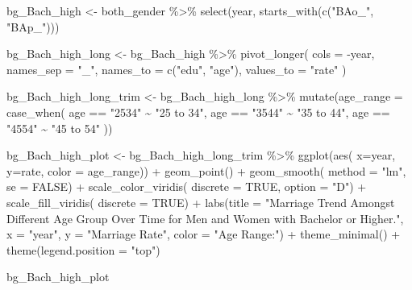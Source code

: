 \documentclass[
]{article}
\newenvironment{Shaded}{\begin{snugshade}}{\end{snugshade}}
\newcommand{\AttributeTok}[1]{\textcolor[rgb]{0.77,0.63,0.00}{#1}}
\newcommand{\ConstantTok}[1]{\textcolor[rgb]{0.00,0.00,0.00}{#1}}
\newcommand{\FunctionTok}[1]{\textcolor[rgb]{0.00,0.00,0.00}{#1}}
\newcommand{\NormalTok}[1]{#1}
\newcommand{\OtherTok}[1]{\textcolor[rgb]{0.56,0.35,0.01}{#1}}
\newcommand{\SpecialCharTok}[1]{\textcolor[rgb]{0.00,0.00,0.00}{#1}}
\newcommand{\StringTok}[1]{\textcolor[rgb]{0.31,0.60,0.02}{#1}}
\begin{document}
\begin{Shaded}
\begin{Highlighting}[]
\NormalTok{bg\_Bach\_high }\OtherTok{\textless{}{-}}\NormalTok{ both\_gender }\SpecialCharTok{\%\textgreater{}\%}
  \FunctionTok{select}\NormalTok{(year, }\FunctionTok{starts\_with}\NormalTok{(}\FunctionTok{c}\NormalTok{(}\StringTok{"BAo\_"}\NormalTok{, }\StringTok{"BAp\_"}\NormalTok{))) }

\NormalTok{bg\_Bach\_high\_long }\OtherTok{\textless{}{-}}\NormalTok{ bg\_Bach\_high }\SpecialCharTok{\%\textgreater{}\%} 
  \FunctionTok{pivot\_longer}\NormalTok{(}
  \AttributeTok{cols =} \SpecialCharTok{{-}}\NormalTok{year,}
  \AttributeTok{names\_sep =} \StringTok{"\_"}\NormalTok{,}
  \AttributeTok{names\_to =} \FunctionTok{c}\NormalTok{(}\StringTok{"edu"}\NormalTok{, }\StringTok{"age"}\NormalTok{),}
  \AttributeTok{values\_to =} \StringTok{"rate"}
\NormalTok{)}

\NormalTok{bg\_Bach\_high\_long\_trim }\OtherTok{\textless{}{-}} 
\NormalTok{  bg\_Bach\_high\_long }\SpecialCharTok{\%\textgreater{}\%} 
  \FunctionTok{mutate}\NormalTok{(}\AttributeTok{age\_range =} \FunctionTok{case\_when}\NormalTok{(}
\NormalTok{    age }\SpecialCharTok{==} \StringTok{"2534"} \SpecialCharTok{\textasciitilde{}} \StringTok{"25 to 34"}\NormalTok{,}
\NormalTok{    age }\SpecialCharTok{==} \StringTok{"3544"} \SpecialCharTok{\textasciitilde{}} \StringTok{"35 to 44"}\NormalTok{,}
\NormalTok{    age }\SpecialCharTok{==} \StringTok{"4554"} \SpecialCharTok{\textasciitilde{}} \StringTok{"45 to 54"}
\NormalTok{  ))}

\NormalTok{bg\_Bach\_high\_plot }\OtherTok{\textless{}{-}}\NormalTok{ bg\_Bach\_high\_long\_trim }\SpecialCharTok{\%\textgreater{}\%} 
  \FunctionTok{ggplot}\NormalTok{(}\FunctionTok{aes}\NormalTok{(}
    \AttributeTok{x=}\NormalTok{year,}
    \AttributeTok{y=}\NormalTok{rate,}
    \AttributeTok{color =}\NormalTok{ age\_range)) }\SpecialCharTok{+}
  \FunctionTok{geom\_point}\NormalTok{() }\SpecialCharTok{+}
  \FunctionTok{geom\_smooth}\NormalTok{(}
    \AttributeTok{method =} \StringTok{"lm"}\NormalTok{,}
    \AttributeTok{se =} \ConstantTok{FALSE}\NormalTok{) }\SpecialCharTok{+}
  \FunctionTok{scale\_color\_viridis}\NormalTok{(}
    \AttributeTok{discrete =} \ConstantTok{TRUE}\NormalTok{, }\AttributeTok{option =} \StringTok{"D"}\NormalTok{) }\SpecialCharTok{+}
  \FunctionTok{scale\_fill\_viridis}\NormalTok{(}
    \AttributeTok{discrete =} \ConstantTok{TRUE}\NormalTok{) }\SpecialCharTok{+}
  \FunctionTok{labs}\NormalTok{(}\AttributeTok{title =} \StringTok{"Marriage Trend Amongst Different Age Group Over Time for Men and Women with Bachelor or Higher."}\NormalTok{, }
       \AttributeTok{x =} \StringTok{"year"}\NormalTok{, }
       \AttributeTok{y =} \StringTok{"Marriage Rate"}\NormalTok{,}
       \AttributeTok{color =} \StringTok{"Age Range:"}\NormalTok{) }\SpecialCharTok{+}
  \FunctionTok{theme\_minimal}\NormalTok{() }\SpecialCharTok{+}
  \FunctionTok{theme}\NormalTok{(}\AttributeTok{legend.position =} \StringTok{"top"}\NormalTok{)}

\NormalTok{bg\_Bach\_high\_plot}
\end{Highlighting}
\end{Shaded}
\end{document}
